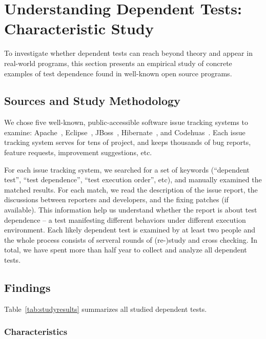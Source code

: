 \section{Understanding Dependent Tests: Characteristic Study}
\label{sec:study}

To investigate whether dependent tests can reach beyond theory
and appear in real-world programs, this section presents an empirical
study of concrete examples of test dependence found in
well-known open source programs. 


\subsection{Sources and Study Methodology}

We chose five well-known, public-accessible software issue
tracking systems to examine: Apache~\cite{apachebug},
Eclipse~\cite{eclipsebug}, JBoss~\cite{jbossbug},
Hibernate~\cite{hibernatebug}, and Codehuas~\cite{codehuasbug}.
Each issue tracking system serves for tens of project, and
keeps thousands of bug reports, feature requests, improvement
suggestions, etc.

For each issue tracking system, we searched for a set of keywords
(``dependent test'', ``test dependence'', ``test execution order'',
etc), and manually examined the matched results. For each match, we read the
description of the issue report, the discussions between reporters
and developers, and the fixing patches (if available). This information
help us understand whether the report is about test dependence
-- a test manifesting different behaviors under different execution
environment. Each likely dependent test is examined by
at least two people and the whole process consists of serveral
rounds of (re-)study and cross checking. In total,
we have spent more than half year to collect and analyze all dependent
tests. 


\subsection{Findings}



Table~\ref{tab:studyresults} summarizes all studied dependent tests.


\subsubsection{Characteristics}

